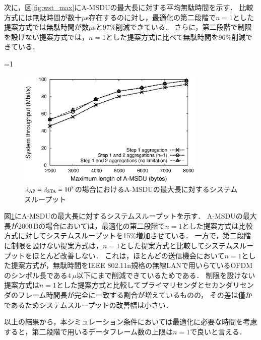 \documentclass[master]{kuisthesis}		%
\newcounter{flagFig}
\begin{document}
			次に，図\ref{fig:wst_max}にA-MSDUの最大長に対する平均無駄時間を示す．
			比較方式には無駄時間が数十$\mu$s存在するのに対し，最適化の第二段階で$n=1$とした提案方式では無駄時間が数$\mu$sと97\%削減できている．
			さらに，第二段階で制限を設けない提案方式では，$n=1$とした提案方式に比べて無駄時間を96\%削減できている．
			\par
			\ifnum\value{flagFig}=1 {\begin{figure}[t]
				\begin{center}
					\includegraphics[width=0.8\textwidth]{graph/thr_max.eps}
					\caption{$\lambda_{\rm AP}=\lambda_{\rm STA}=10^5$の場合におけるA-MSDUの最大長に対するシステムスループット}
					\label{fig:thr_max}
				\end{center}
			\end{figure}}\fi
			図\ref{fig:thr_max}にA-MSDUの最大長に対するシステムスループットを示す．
			A-MSDUの最大長が2000\,Bの場合においては，最適化の第二段階で$n=1$とした提案方式は比較方式に対してシステムスループットを15\%増加させている．
			一方で，第二段階に制限を設けない提案方式は，$n=1$とした提案方式と比較してシステムスループットをほとんど改善しない．
			これは，ほとんどの送信機会において$n=1$とした提案方式が，無駄時間をIEEE 802.11n規格の無線LANで用いらているOFDMのシンボル長である$4\,\mu$以下にまで削減できているためである．
			制限を設けない提案方式は$n=1$とした提案方式と比較してプライマリセンダとセカンダリセンダのフレーム時間長が完全に一致する割合が増えているものの，
			その差は僅かであるためシステムスループットの改善幅は小さい．
			\par
			以上の結果から，本シミュレーション条件においては最適化に必要な時間を考慮すると，第二段階で用いるデータフレーム数の上限は$n=1$で良いと言える．
			\par
\end{document}
